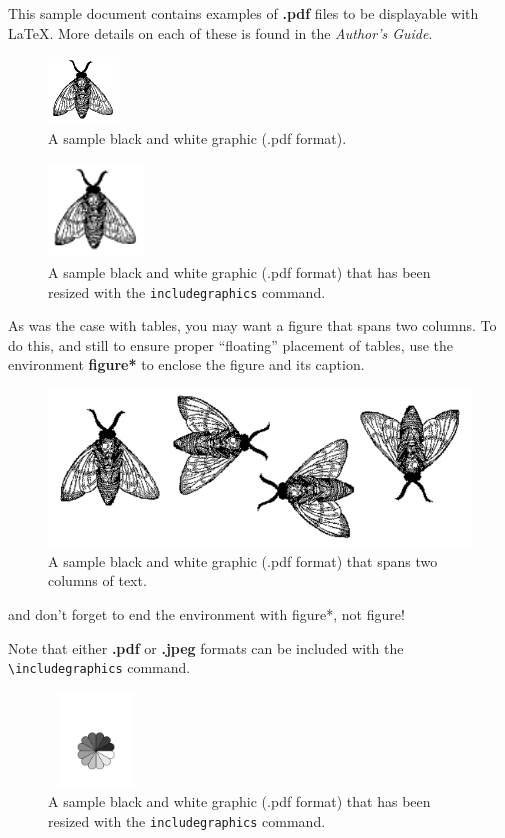 \documentclass[twoside,letterpaper]{soups}
\begin{document}
This sample document contains examples of \textbf{.pdf}
files to be displayable with \LaTeX.  More
details on each of these is found in the \textit{Author's Guide}.

\begin{figure}
\centering
\includegraphics{fly}
\caption{A sample black and white graphic (.pdf format).}
\end{figure}

\begin{figure}
\centering
\includegraphics[height=1in,width=1in]{fly}
\caption{A sample black and white graphic (.pdf format)
that has been resized with the \texttt{includegraphics} command.}
\end{figure}


As was the case with tables, you may want a figure
that spans two columns.  To do this, and still to
ensure proper ``floating'' placement of tables, use the environment
\textbf{figure*} to enclose the figure and its caption.
\begin{figure}
\centering
\includegraphics{flies}
\caption{A sample black and white graphic (.pdf format)
that spans two columns of text.}
\end{figure}
and don't forget to end the environment with
{figure*}, not {figure}!

Note that either {\textbf{.pdf}} or {\textbf{.jpeg}} formats can be
included with the \verb+\includegraphics+ command.

\begin{figure}
\centering
\includegraphics[height=1in,width=1in]{rosette}
\caption{A sample black and white graphic (.pdf format) that has
been resized with the \texttt{includegraphics} command.}
\vskip -6pt
\end{figure}
\end{document}
